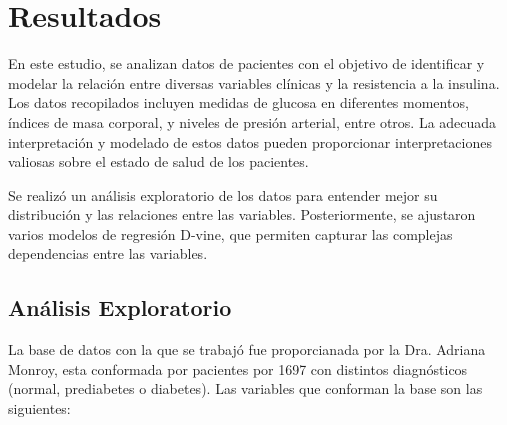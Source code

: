 \chapter{Resultados}\label{Resultados}

En este estudio, se analizan datos de pacientes con el objetivo de identificar y modelar la relación entre diversas variables clínicas y la resistencia a la insulina. Los datos recopilados incluyen medidas de glucosa en diferentes momentos, índices de masa corporal, y niveles de presión arterial, entre otros. La adecuada interpretación y modelado de estos datos pueden proporcionar interpretaciones valiosas sobre el estado de salud de los pacientes. 

Se realizó un análisis exploratorio de los datos para entender mejor su distribución y las relaciones entre las variables. Posteriormente, se ajustaron varios modelos de regresión D-vine, que permiten capturar las complejas dependencias entre las variables. 

\section{Análisis Exploratorio}

La base de datos con la que se trabajó fue proporcianada por la Dra. Adriana Monroy, esta conformada por pacientes por 1697 con distintos diagnósticos (normal, prediabetes o diabetes). Las variables que conforman la base son las siguientes:

